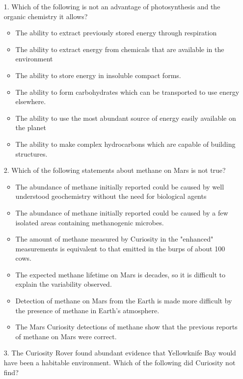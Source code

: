\begin{enumerate}
    \item[1.] Which of the following is  not  an advantage of photosynthesis and the organic chemistry it allows?

\begin{itemize}[label={$\bullet$}]
    \item The ability to extract previously stored energy through respiration
    \item The ability to extract energy from chemicals that are available in the environment
    \item The ability to store energy in insoluble compact forms.
    \item The ability to form carbohydrates which can be transported to use energy elsewhere.
    \item The ability to use the most abundant source of energy easily available on the planet
    \item The ability to make complex hydrocarbons which are capable of building structures.
\end{itemize}

\item[2.] Which of the following statements about methane on Mars is  not  true?

\begin{itemize}[label={$\bullet$}]
    \item The abundance of methane initially reported could be caused by well understood geochemistry without the need for biological agents
    \item The abundance of methane initially reported could be caused by a few isolated areas containing methanogenic microbes.
    \item The amount of methane measured by Curiosity in the "enhanced" measurements is equivalent to that emitted in the burps of about 100 cows.
    \item The expected methane lifetime on Mars is decades, so it is difficult to explain the variability observed.
    \item Detection of methane on Mars from the Earth is made more difficult by the presence of methane in Earth's atmosphere.
    \item The Mars Curiosity detections of methane show that the previous reports of methane on Mars were correct.
\end{itemize}

\item[3.] The Curiosity Rover found abundant evidence that Yellowknife Bay would have been a habitable environment. Which of the following did Curiosity  not  find?


\end{enumerate}
